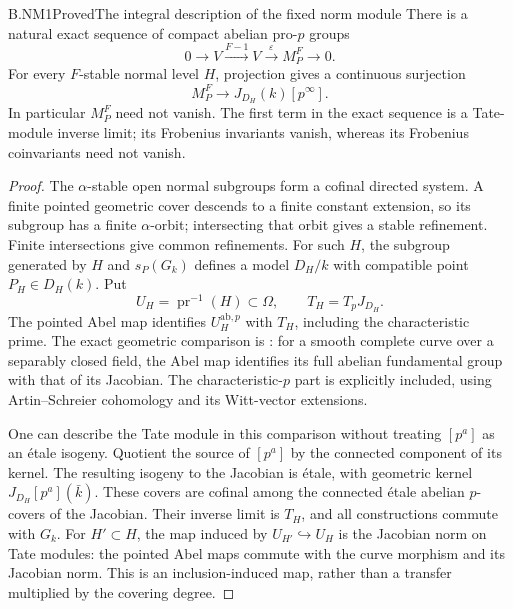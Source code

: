 \begin{claim}{B.NM1}{Proved}{The integral description of the fixed norm module}
There is a natural exact sequence of compact abelian pro-$p$ groups
\[
 0\longrightarrow V\xrightarrow{F-1}V
   \xrightarrow{\varepsilon}M_P^F\longrightarrow0.
\]
For every $F$-stable normal level $H$, projection gives a continuous
surjection
\[
 M_P^F\longrightarrow J_{D_H}(k)[p^\infty].
\]
In particular $M_P^F$ need not vanish. The first term in the exact
sequence is a Tate-module inverse limit; its Frobenius invariants
vanish, whereas its Frobenius coinvariants need not vanish.
\end{claim}
\begin{proof}
The $\alpha$-stable open normal subgroups form a cofinal directed
system. A finite pointed geometric cover descends to a finite
constant extension, so its subgroup has a finite $\alpha$-orbit;
intersecting that orbit gives a stable refinement. Finite
intersections give common refinements. For such $H$, the subgroup
generated by $H$ and $s_P(G_k)$ defines a model $D_H/k$ with
compatible point $P_H\in D_H(k)$. Put
\[
 U_H=\operatorname{pr}^{-1}(H)\subset\Omega,
 \qquad T_H=T_pJ_{D_H}.
\]
The pointed Abel map identifies $U_H^{\mathrm{ab},p}$ with $T_H$,
including the characteristic prime. The exact geometric comparison
is \cite[Proposition 9.1, Lemmas 9.4--9.5, and Corollary 9.6]{MilneJac}:
for a smooth complete curve over a separably closed field, the Abel
map identifies its full abelian fundamental group with that of its
Jacobian. The characteristic-$p$ part is explicitly included, using
Artin--Schreier cohomology and its Witt-vector extensions.

One can describe the Tate module in this comparison without treating
$[p^a]$ as an étale isogeny. Quotient the source of $[p^a]$ by
the connected component of its kernel. The resulting isogeny to the
Jacobian is étale, with geometric kernel
$J_{D_H}[p^a](\bar k)$. These covers are cofinal among the
connected étale abelian $p$-covers of the Jacobian. Their inverse
limit is $T_H$, and all constructions commute with $G_k$.
For $H'\subset H$, the map induced by
$U_{H'}\hookrightarrow U_H$ is the Jacobian norm on Tate modules:
the pointed Abel maps commute with the curve morphism and its
Jacobian norm. This is an inclusion-induced map, rather than a
transfer multiplied by the covering degree.


\end{proof}
